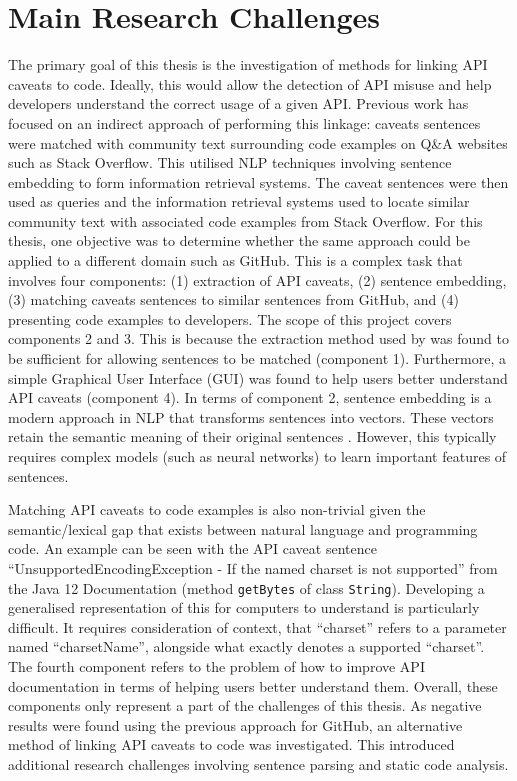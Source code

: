 \section{Main Research Challenges}
\label{sec:mainresearchchallenges}
The primary goal of this thesis is the investigation of methods for linking API caveats to code. Ideally, this would allow the detection of API misuse and help developers understand the correct usage of a given API. Previous work has focused on an indirect approach of performing this linkage: caveats sentences were matched with community text surrounding code examples on Q\&A websites such as Stack Overflow. This utilised NLP techniques involving sentence embedding to form information retrieval systems. The caveat sentences were then used as queries and the information retrieval systems used to locate similar community text with associated code examples from Stack Overflow. For this thesis, one objective was to determine whether the same approach could be applied to a different domain such as GitHub. This is a complex task that involves four components: (1) extraction of API caveats, (2) sentence embedding, (3) matching caveats sentences to similar sentences from GitHub, and (4) presenting code examples to developers. The scope of this project covers components 2 and 3. This is because the extraction method used by \cite{jiamou} was found to be sufficient for allowing sentences to be matched (component 1). Furthermore, a simple Graphical User Interface (GUI) was found to help users better understand API caveats (component 4). In terms of component 2, sentence embedding is a modern approach in NLP that transforms sentences into vectors. These vectors retain the semantic meaning of their original sentences \cite{palangi2016deep}. However, this typically requires complex models (such as neural networks) to learn important features of sentences. \bigbreak

Matching API caveats to code examples is also non-trivial given the semantic/lexical gap that exists between natural language and programming code. An example can be seen with the API caveat sentence ``UnsupportedEncodingException - If the named charset is not supported'' from the Java 12 Documentation (method \lstinline{getBytes} of class \lstinline{String}). Developing a generalised representation of this for computers to understand is particularly difficult. It requires consideration of context, that ``charset'' refers to a parameter named ``charsetName'', alongside what exactly denotes a supported ``charset''. The fourth component refers to the problem of how to improve API documentation in terms of helping users better understand them. Overall, these components only represent a part of the challenges of this thesis. As negative results were found using the previous approach for GitHub, an alternative method of linking API caveats to code was investigated. This introduced additional research challenges involving sentence parsing and static code analysis.\bigbreak

